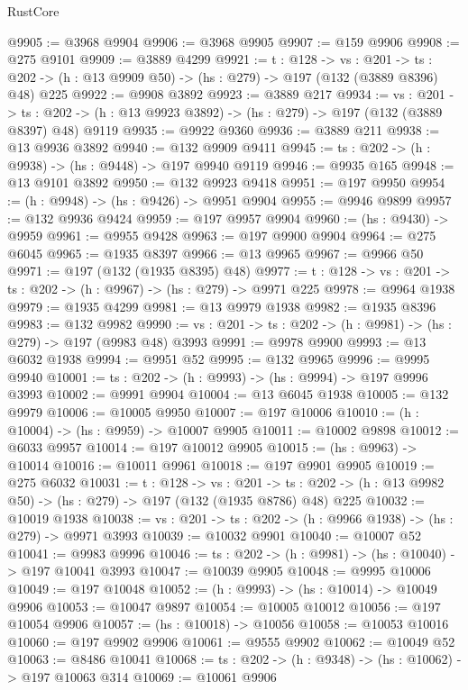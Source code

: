 \begin{lexlean}{RustCore}
\begin{coremodule}
@9905 := @3968 @9904
@9906 := @3968 @9905
@9907 := @159 @9906
@9908 := @275 @9101
@9909 := @3889 @4299
@9921 := {t : @128} ->
  {vs : @201} ->
  {ts : @202} -> (h : @13 @9909 @50) -> (hs : @279) -> @197 (@132 (@3889 @8396) @48) @225
@9922 := @9908 @3892
@9923 := @3889 @217
@9934 := {vs : @201} ->
  {ts : @202} -> (h : @13 @9923 @3892) -> (hs : @279) -> @197 (@132 (@3889 @8397) @48) @9119
@9935 := @9922 @9360
@9936 := @3889 @211
@9938 := @13 @9936 @3892
@9940 := @132 @9909 @9411
@9945 := {ts : @202} -> (h : @9938) -> (hs : @9448) -> @197 @9940 @9119
@9946 := @9935 @165
@9948 := @13 @9101 @3892
@9950 := @132 @9923 @9418
@9951 := @197 @9950
@9954 := (h : @9948) -> (hs : @9426) -> @9951 @9904
@9955 := @9946 @9899
@9957 := @132 @9936 @9424
@9959 := @197 @9957 @9904
@9960 := (hs : @9430) -> @9959
@9961 := @9955 @9428
@9963 := @197 @9900 @9904
@9964 := @275 @6045
@9965 := @1935 @8397
@9966 := @13 @9965
@9967 := @9966 @50
@9971 := @197 (@132 (@1935 @8395) @48)
@9977 := {t : @128} -> {vs : @201} -> {ts : @202} -> (h : @9967) -> (hs : @279) -> @9971 @225
@9978 := @9964 @1938
@9979 := @1935 @4299
@9981 := @13 @9979 @1938
@9982 := @1935 @8396
@9983 := @132 @9982
@9990 := {vs : @201} -> {ts : @202} -> (h : @9981) -> (hs : @279) -> @197 (@9983 @48) @3993
@9991 := @9978 @9900
@9993 := @13 @6032 @1938
@9994 := @9951 @52
@9995 := @132 @9965
@9996 := @9995 @9940
@10001 := {ts : @202} -> (h : @9993) -> (hs : @9994) -> @197 @9996 @3993
@10002 := @9991 @9904
@10004 := @13 @6045 @1938
@10005 := @132 @9979
@10006 := @10005 @9950
@10007 := @197 @10006
@10010 := (h : @10004) -> (hs : @9959) -> @10007 @9905
@10011 := @10002 @9898
@10012 := @6033 @9957
@10014 := @197 @10012 @9905
@10015 := (hs : @9963) -> @10014
@10016 := @10011 @9961
@10018 := @197 @9901 @9905
@10019 := @275 @6032
@10031 := {t : @128} ->
  {vs : @201} ->
  {ts : @202} -> (h : @13 @9982 @50) -> (hs : @279) -> @197 (@132 (@1935 @8786) @48) @225
@10032 := @10019 @1938
@10038 := {vs : @201} -> {ts : @202} -> (h : @9966 @1938) -> (hs : @279) -> @9971 @3993
@10039 := @10032 @9901
@10040 := @10007 @52
@10041 := @9983 @9996
@10046 := {ts : @202} -> (h : @9981) -> (hs : @10040) -> @197 @10041 @3993
@10047 := @10039 @9905
@10048 := @9995 @10006
@10049 := @197 @10048
@10052 := (h : @9993) -> (hs : @10014) -> @10049 @9906
@10053 := @10047 @9897
@10054 := @10005 @10012
@10056 := @197 @10054 @9906
@10057 := (hs : @10018) -> @10056
@10058 := @10053 @10016
@10060 := @197 @9902 @9906
@10061 := @9555 @9902
@10062 := @10049 @52
@10063 := @8486 @10041
@10068 := {ts : @202} -> (h : @9348) -> (hs : @10062) -> @197 @10063 @314
@10069 := @10061 @9906

\end{coremodule}
\end{lexlean}
